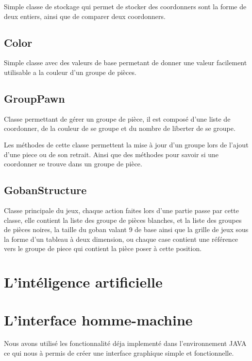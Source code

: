 \documentclass[12pt,a4paper,utf8x]{report}
\begin{document}
\begin{onehalfspace}
			Simple classe de stockage qui permet de stocker des coordonners sont la forme de deux entiers,
			ainsi que de comparer deux coordonners.
		
		\subsection{Color}
		
			Simple classe avec des valeurs de base permetant de donner une valeur facilement utilisable a 
			la couleur d'un groupe de pièces.
		
		\subsection{GroupPawn}
		
			Classe permettant de gérer un groupe de pièce, il est composé d'une liste de coordonner, de la couleur de se groupe
			et du nombre de liberter de se groupe.
			
			Les méthodes de cette classe permettent la mise à jour d'un groupe lors de l'ajout d'une piece ou de son retrait. Ainsi
			que des méthodes pour savoir si une coordonner se trouve dans un groupe de pièce.
		
		\subsection{GobanStructure}
		
			Classe principale du jeux, chaque action faites lors d'une partie passe par cette classe, elle contient la liste des groupe 
			de pièces blanches, et la liste des groupes de pièces noires, la taille du goban valant 9 de base ainsi que la grille de jeux
			sous la forme d'un tableau à deux dimension, ou chaque case contient une référence vers le groupe de piece qui contient la pièce
			poser à cette position.

	\section{L'intéligence artificielle}

	
	\section{L'interface homme-machine}
	
		Nous avons utilisé les fonctionnalité déja implementé dans l'environnement JAVA ce qui nous à permis de créer une interface graphique simple et fonctionnelle.
	

\end{onehalfspace}
\end{document}
